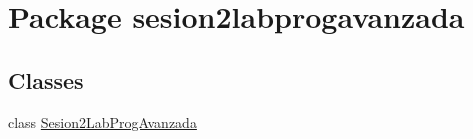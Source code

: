 \hypertarget{namespacesesion2labprogavanzada}{}\section{Package sesion2labprogavanzada}
\label{namespacesesion2labprogavanzada}
\subsection*{Classes}
\begin{DoxyCompactItemize}
\item 
class \mbox{\hyperlink{classsesion2labprogavanzada_1_1_sesion2_lab_prog_avanzada}{Sesion2\+Lab\+Prog\+Avanzada}}
\end{DoxyCompactItemize}
